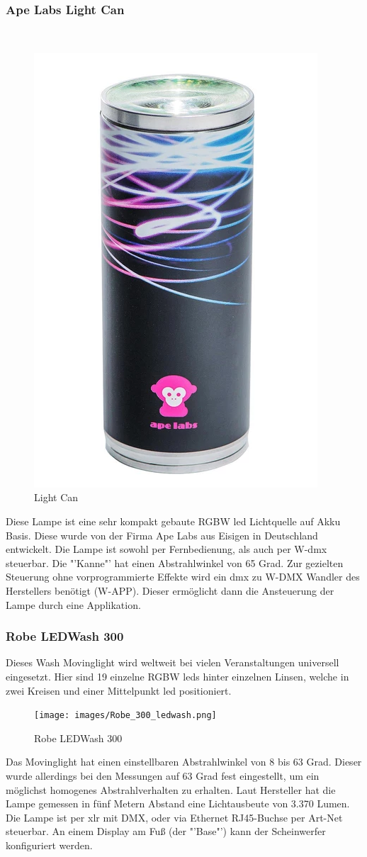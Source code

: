 \documentclass[11pt]{scrartcl}
\begin{document}
\subsubsection{Ape Labs Light Can}
~\par\vspace{-\baselineskip}
\begin{figure}
    \vspace{-45pt}
    \begin{center}
        \includegraphics[width=.23\textwidth]{images/light_can_front.png}
    \end{center}
    \vspace{-20pt}
    \begin{center}
        \caption[Light Can]{Light Can\\\cite{lightCan}}
    \end{center}
    \vspace{-15pt}
\end{figure}
\noindent
Diese Lampe ist eine sehr kompakt gebaute RGBW \ac{led} Lichtquelle auf Akku Basis. Diese wurde von der Firma Ape Labs aus Eisigen in
Deutschland entwickelt. Die Lampe ist sowohl per Fernbedienung, als auch per W-\ac{dmx} steuerbar.
Die "'Kanne"' hat einen Abstrahlwinkel von 65 Grad. Zur gezielten Steuerung ohne vorprogrammierte Effekte wird ein \ac{dmx} zu W-DMX
Wandler des Herstellers benötigt (W-APP). Dieser ermöglicht dann die Ansteuerung der Lampe durch eine Applikation.
\subsubsection{Robe LEDWash 300}
Dieses Wash Movinglight wird weltweit bei vielen Veranstaltungen universell eingesetzt. Hier sind 19 einzelne
RGBW \ac{led}s hinter einzelnen Linsen, welche in zwei Kreisen und einer Mittelpunkt \ac{led} positioniert.
\begin{figure}[H]
    \begin{center}
        \texttt{[image: images/Robe\_300\_ledwash.png]}
    \end{center}
    \caption[Robe LEDWash 300]{Robe LEDWash 300 \cite{robe}}
\end{figure}
\noindent
Das Movinglight hat einen einstellbaren Abstrahlwinkel von 8 bis 63 Grad. Dieser wurde allerdings bei den Messungen auf 63 Grad fest
eingestellt, um ein möglichst homogenes Abstrahlverhalten zu erhalten. Laut Hersteller hat die Lampe gemessen in fünf Metern Abstand eine
Lichtausbeute von 3.370 Lumen. Die Lampe ist per \ac{xlr} mit DMX, oder via Ethernet RJ45-Buchse per Art-Net steuerbar. An einem
Display am Fuß (der "'Base"') kann der Scheinwerfer konfiguriert werden.
\end{document}

